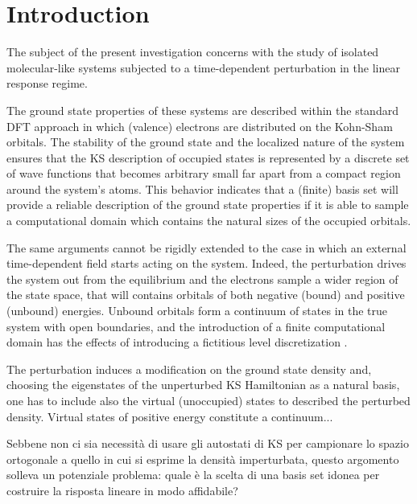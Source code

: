 \documentclass[reprint,aps,prb]{revtex4-1}
\begin{document}
\section{Introduction}

The subject of the present investigation concerns with the study of isolated molecular-like systems subjected to a time-dependent perturbation in the linear response regime.

The ground state properties of these systems are described within the standard DFT approach in which (valence) electrons are distributed on the Kohn-Sham orbitals. The stability of
the ground state and the localized nature of the system ensures that the KS description of occupied states is represented by a discrete set of wave functions that becomes arbitrary 
small far apart from a compact region around the system's atoms. This behavior indicates that a (finite) basis set will provide a reliable description of the ground state properties 
if it is able to sample a computational domain which contains the natural sizes of the occupied orbitals\cite{boffi2016}. %

The same arguments cannot be rigidly extended to the case in which an external time-dependent field starts acting on the system. Indeed, the perturbation drives the system out 
from the equilibrium and the electrons sample a wider region of the state space, that will contains orbitals of both negative (bound) and positive (unbound) energies. Unbound orbitals 
form a continuum of states in the true system with open boundaries, and the introduction of a finite computational domain has the effects of introducing a fictitious level discretization
\cite{boffi2016}.   



The perturbation induces a modification on the ground state density and, choosing the
eigenstates of the unperturbed KS Hamiltonian as a natural basis, one has to include also the virtual (unoccupied) states to described the perturbed density. Virtual states of
positive energy constitute a continuum...

Sebbene non ci sia necessità di usare gli autostati di KS per campionare lo spazio ortogonale a quello in cui si esprime la densità imperturbata, questo argomento solleva un potenziale
problema: quale è la scelta di una basis set idonea per costruire la risposta lineare in modo affidabile?
\end{document}
